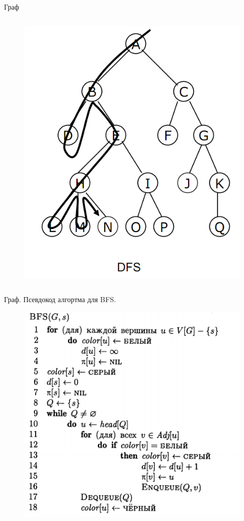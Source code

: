 \documentclass[newPxFont]{beamer}
\begin{document}
\begin{frame}{Граф}
\begin{columns}
\begin{column}{.4\linewidth}
\begin{figure}
		\centerline{\includegraphics[width=1.0\linewidth]{images/dfs.png}}
		\end{figure}
	\end{column}
\end{columns}
\end{frame}


\begin{frame}{Граф. Псевдокод алгортма для BFS.}
\begin{figure}
\centerline{\includegraphics[width=0.7\linewidth]{images/bfs_algo.png}}
\end{figure}
\end{frame}
\end{document}
